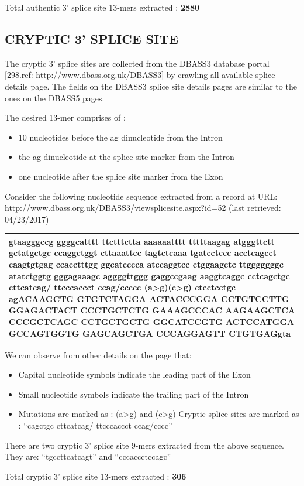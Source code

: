 \documentclass[12pt,a4paper]{article}
\begin{document}
	Total authentic 3’ splice site 13-mers extracted : \textbf{2880}
	\subsection{CRYPTIC 3' SPLICE SITE}
	The cryptic 3’ splice sites are collected from the DBASS3 database portal [298.ref: http://www.dbass.org.uk/DBASS3] by crawling all available splice details page. The fields on the DBASS3 splice site details pages are similar to the ones on the DBASS5 pages. \par 
	The desired 13-mer comprises of : 
	\begin{itemize}
		\item 10 nucleotides before the ag dinucleotide from the Intron
		\item the ag dinucleotide at the splice site marker from the Intron
		\item one nucleotide after the splice site marker from the Exon
	\end{itemize}
	Consider the following nucleotide sequence extracted from a record at URL: http://www.dbass.org.uk/DBASS3/viewsplicesite.aspx?id=52 (last retrieved: 04/23/2017)\par
	\vspace{5mm}	
	\begin{tabular}{ | p{\linewidth} |}
		\hline
		gtaagggccg ggggcatttt ttctttctta aaaaaatttt tttttaagag atgggttctt gctatgctgc ccaggctggt cttaaattcc tagtctcaaa tgatcctccc acctcagcct caagtgtgag ccacctttgg ggcatcccca atccaggtcc ctggaagctc ttgggggggc atatctggtg gggagaaagc aggggttggg gaggccgaag aaggtcaggc cctcagctgc cttcatca\textbf{g/ t}tcccaccct cca\textbf{g/c}cccc \textbf{(a>g)}\textbf{(c>g)} ctcctcctgc agACAAGCTG GTGTCTAGGA ACTACCCGGA CCTGTCCTTG GGAGACTACT CCCTGCTCTG GAAAGCCCAC AAGAAGCTCA CCCGCTCAGC CCTGCTGCTG GGCATCCGTG ACTCCATGGA GCCAGTGGTG GAGCAGCTGA CCCAGGAGTT CTGTGAGgta \\
		\hline
	\end{tabular}
	\vspace{5mm} \break
	We can observe from other details on the page that:
	\begin{itemize}
	\item Capital nucleotide symbols indicate the leading part of the Exon
	\item Small nucleotide symbols indicate the trailing part of the Intron
	\item Mutations are marked as : (a>g) and (c>g)
	Cryptic splice sites are marked as : “cagctgc cttcatcag/ ttcccaccct ccag/cccc”
	\end{itemize}
	There are two cryptic 3’ splice site 9-mers extracted from the above sequence. They are: “tgccttcatcagt” and “cccaccctccagc” \par
	Total cryptic 3’ splice site 13-mers extracted : \textbf{306}
\end{document}
